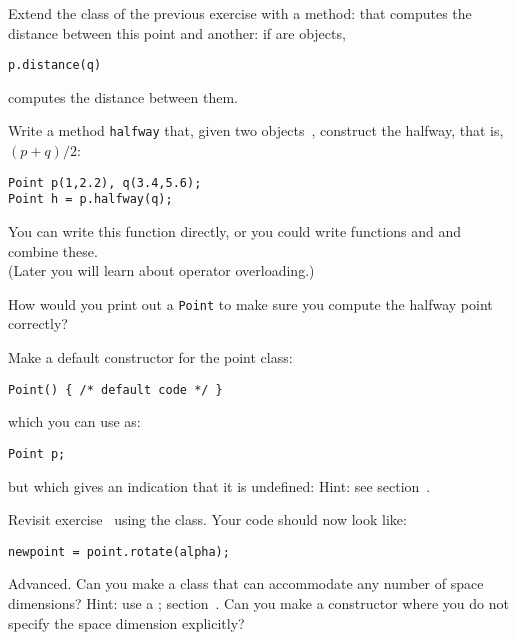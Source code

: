 \begin{exercise}
  \label{ex:geom:pointpoint}
  Extend the  class of the previous exercise with a method:
   that computes the distance between this point and
  another: if  are  objects,
\begin{lstlisting}
p.distance(q) 
\end{lstlisting}
computes the distance between them.
\end{exercise}


\begin{exercise}
  \label{ex:geom:pointhalfway}
  Write a method \lstinline{halfway} that, given two 
  objects~, construct the  halfway, that
  is,~$(p+q)/2$:
\begin{lstlisting}
Point p(1,2.2), q(3.4,5.6);
Point h = p.halfway(q);
\end{lstlisting}

  You can write this function directly, or you could write functions
   and  and combine these.\\
  (Later you will learn about operator overloading.)

  How would you print out a \lstinline{Point} to make sure
  you compute the halfway point correctly?
\end{exercise}

\begin{exercise}
  Make a default constructor for the point class:
\begin{lstlisting}
Point() { /* default code */ }
\end{lstlisting}
  which you can use as:
\begin{lstlisting}
Point p;
\end{lstlisting}
but which gives an indication that it is undefined:
%
%
Hint: see section~.
\end{exercise}

\begin{exercise}
  \label{ex:pointrotate-class}
  Revisit exercise~ using the 
  class. Your code should now look like:
\begin{lstlisting}
newpoint = point.rotate(alpha);
\end{lstlisting}
\end{exercise}

\begin{exercise}
  Advanced. Can you make a  class that can accommodate any
  number of space dimensions? Hint: use a ;
  section~. Can you make a constructor where you do
  not specify the space dimension explicitly?
\end{exercise}

